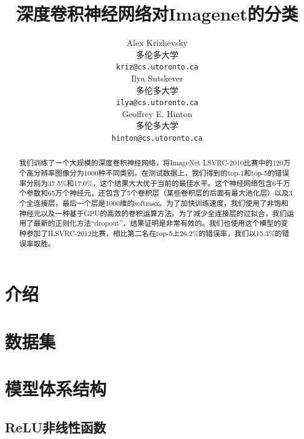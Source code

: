 \documentclass[12pt]{article}
\title{深度卷积神经网络对\textsf{Imagenet}的分类}
\author{
  Alex Krizhevsky \\
  多伦多大学\\
  \texttt{kriz@cs.utoronto.ca} \\
   \And
 Ilya Sutskever \\
  多伦多大学\\
  \texttt{ilya@cs.utoronto.ca} \\
  \And
 Geoffrey E. Hinton\\
  多伦多大学\\
  \texttt{hinton@cs.utoronto.ca}
}
\date{}
\begin{document}
\begin{CJK*}{UTF8}{gkai}\CJKindent
\maketitle

\renewcommand{\abstractname}{\Large摘要}
\begin{abstract}

我们训练了一个大规模的深度卷积神经网络，将ImageNet LSVRC-2010比赛中的120万个高分辨率图像分为1000种不同类别。在测试数据上，我们得到的top-1和top-5的错误率分别为37.5\%和17.0\%，这个结果大大优于当前的最佳水平。这个神经网络包含6千万个参数和65万个神经元，还包含了5个卷积层（某些卷积层的后面有最大池化层）以及3个全连接层，最后一个层是1000维的softmax。为了加快训练速度，我们使用了非饱和神经元以及一种基于GPU的高效的卷积运算方法。为了减少全连接层的过拟合，我们运用了最新的正则化方法“dropout”，结果证明是非常有效的。我们也使用这个模型的变种参加了ILSVRC-2012比赛，相比第二名在top-5上26.2\%的错误率，我们以15.3\%的错误率取胜。
\end{abstract}




\section{介绍}



\section{数据集}



\section{模型体系结构}



\subsection{ReLU非线性函数}



\end{CJK*}
\end{document}

